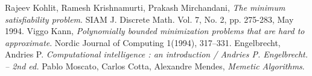 \documentclass[12pt, a4paper]{article}
\theoremstyle{definition}
\begin{document}
\newpage

\begin{thebibliography}{9}
Rajeev Kohlit, Ramesh Krishnamurti, Prakash Mirchandani, \emph{The minimum satisfiability problem}. SIAM J. Discrete Math. Vol. 7, No. 2, pp. 275-283, May 1994.
Viggo Kann, \emph{Polynomially bounded minimization problems that are hard to approximate}. Nordic Journal of Computing 1(1994), 317–331.
Engelbrecht, Andries P. \emph{Computational intelligence : an introduction / Andries P. Engelbrecht. – 2nd ed.}
Pablo Moscato, Carlos Cotta, Alexandre Mendes, \emph{Memetic Algorithms}. 
\end{thebibliography}
\end{document}
